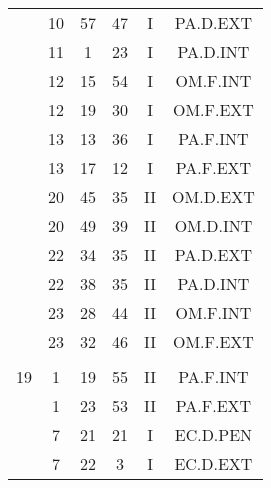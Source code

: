 \documentclass[12pt, a4paper]{article}
\begin{document}
\begin{multicols}{3}
{\begin{tabular}{c c c c c c}
	 	 	 	 & 10 & 57 & 47 & I & PA.D.EXT\\%
	 	 	 	 & 11 & 1 & 23 & I & PA.D.INT\\%
	 	 	 	 & 12 & 15 & 54 & I & OM.F.INT\\%
	 	 	 	 & 12 & 19 & 30 & I & OM.F.EXT\\%
	 	 	 	 & 13 & 13 & 36 & I & PA.F.INT\\%
	 	 	 	 & 13 & 17 & 12 & I & PA.F.EXT\\%
	 	 	 	 & 20 & 45 & 35 & II & OM.D.EXT\\%
	 	 	 	 & 20 & 49 & 39 & II & OM.D.INT\\%
	 	 	 	 & 22 & 34 & 35 & II & PA.D.EXT\\%
	 	 	 	 & 22 & 38 & 35 & II & PA.D.INT\\%
	 	 	 	 & 23 & 28 & 44 & II & OM.F.INT\\%
	 	 	 	 & 23 & 32 & 46 & II & OM.F.EXT\\%
	 	 	 	 & & & & & \\%
	 	 	 	19 & 1 & 19 & 55 & II & PA.F.INT\\%
	 	 	 	 & 1 & 23 & 53 & II & PA.F.EXT\\%
	 	 	 	 & 7 & 21 & 21 & I & EC.D.PEN\\%
	 	 	 	 & 7 & 22 & 3 & I & EC.D.EXT\\%
	 	 \end{tabular}
 	}
\end{multicols}
\end{document}
